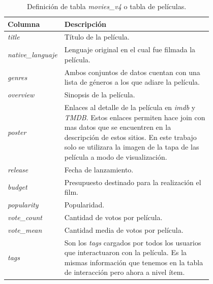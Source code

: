 \documentclass[11pt,a4paper,twoside]{thesis}
\begin{document}
\begin{table}[!htb]
	\centering
	\footnotesize
	\begin{tabular}{l | p{0.8\linewidth}}
		\hline
		Columna                   & Descripción                                                                              \\
		\hline

		\textit{title}            & Título de la película.                                                                   \\
		\textit{native\_languaje} & Lenguaje original en el cual fue filmada la película.                                    \\
		\textit{genres}           & Ambos conjuntos de datos cuentan con una lista de géneros a los que adiare la película.  \\
		\textit{overview}         & Sinopsis de la película.                                                                 \\
		\textit{poster}           & Enlaces al detalle de la película en \textit{imdb} y \textit{TMDB}. Estos enlaces
		permiten hace join con mas datos que se encuentren en la descripción de estos
		sitios. En este trabajo solo se utilizara la imagen de la tapa de las película
		a modo de visualización.                                                                                             \\
		\textit{release}          & Fecha de lanzamiento.                                                                    \\
		\textit{budget}           & Presupuesto destinado para la realización el film.                                       \\
		\textit{popularity}       & Popularidad.                                                                             \\
		\textit{vote\_count}      & Cantidad de votos por película.                                                          \\
		\textit{vote\_mean}       & Cantidad media de votos por película.                                                    \\
		\textit{tags}             & Son los \textit{tags} cargados por todos los usuarios que interactuaron con la película.
		Es la mismas información que tenemos en la tabla de interacción pero ahora a nivel ítem.                             \\

		\hline
	\end{tabular}
	\caption{
		Definición de tabla \textit{movies\_v4} o tabla de películas.
	}
	\label{table:moviesTableDef}
\end{table}
\end{document}
